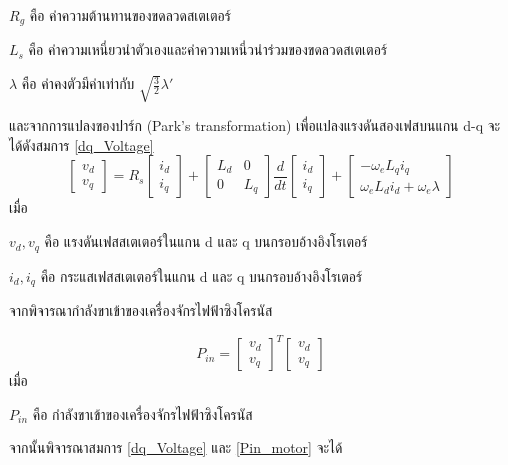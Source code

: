 \documentclass[11pt,a4paper]{article}
\begin{document}
$R_{g}$               คือ ค่าความต้านทานของขดลวดสเตเตอร์

$L_{s}$   คือ ค่าความเหนี่ยวนำตัวเองและค่าความเหนี่วนำร่วมของขดลวดสเตเตอร์

$\lambda$ คือ ค่าคงตัวมีค่าเท่ากับ $\sqrt{\frac{3}{2}}\lambda'$

และจากการแปลงของปาร์ก (Park’s transformation) \cite{sswch3} \cite{vectorIEEE} เพื่อแปลงแรงดันสองเฟสบนแกน d-q จะได้ดังสมการ \ref{dq_Voltage}
\begin{equation}\label{dq_Voltage}
    \begin{bmatrix}
        v_{d} \\v_{q}
    \end{bmatrix} = R_{s}
    \begin{bmatrix}
        i_{d} \\i_{q}
    \end{bmatrix} +
    \begin{bmatrix}
        L_{d} & 0 \\ 0 & L_{q}
    \end{bmatrix}\frac{d}{dt}
    \begin{bmatrix}
        i_{d} \\i_{q}
    \end{bmatrix}+
    \begin{bmatrix}
        -\omega_{e} L_{q} i_{q} \\\omega_{e}L_{d}i_{d}+\omega_{e}\lambda
    \end{bmatrix}
\end{equation}
เมื่อ

$v_{d},v_{q}$ คือ แรงดันเฟสสเตเตอร์ในแกน d และ q บนกรอบอ้างอิงโรเตอร์

$i_{d},i_{q}$ คือ กระแสเฟสสเตเตอร์ในแกน d และ q บนกรอบอ้างอิงโรเตอร์

จากพิจารณากำลังขาเข้าของเครื่องจักรไฟฟ้าซิงโครนัส

\begin{equation}\label{Pin_motor}
    P_{in} =
    \begin{bmatrix}
        v_{d} \\v_{q}
    \end{bmatrix}^T
    \begin{bmatrix}
        v_{d} \\v_{q}
    \end{bmatrix}
\end{equation}
เมื่อ

$P_{in}$ คือ กำลังขาเข้าของเครื่องจักรไฟฟ้าซิงโครนัส

จากนั้นพิจารณาสมการ \ref{dq_Voltage} และ \ref{Pin_motor} จะได้
\end{document}
